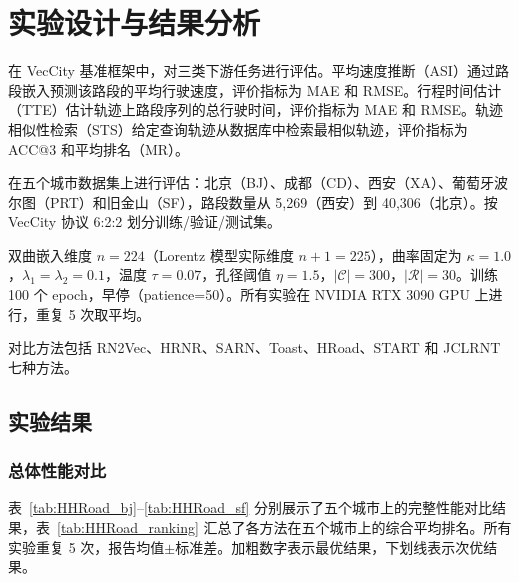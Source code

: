 \section{实验设计与结果分析}

在 VecCity\cite{zhang2025veccity} 基准框架中，对三类下游任务进行评估。平均速度推断（ASI）通过路段嵌入预测该路段的平均行驶速度，评价指标为 MAE 和 RMSE。行程时间估计（TTE）估计轨迹上路段序列的总行驶时间，评价指标为 MAE 和 RMSE。轨迹相似性检索（STS）给定查询轨迹从数据库中检索最相似轨迹，评价指标为 ACC@3 和平均排名（MR）。

在五个城市数据集上进行评估：北京（BJ）、成都（CD）、西安（XA）、葡萄牙波尔图（PRT）和旧金山（SF），路段数量从 5,269（西安）到 40,306（北京）。按 VecCity 协议 6:2:2 划分训练/验证/测试集。

双曲嵌入维度 $n=224$（Lorentz 模型实际维度 $n+1=225$），曲率固定为 $\kappa=1.0$，$\lambda_1=\lambda_2=0.1$，温度 $\tau=0.07$，孔径阈值 $\eta=1.5$，$|\mathcal{C}|=300$，$|\mathcal{R}|=30$。训练 100 个 epoch，早停（patience=50）。所有实验在 NVIDIA RTX 3090 GPU 上进行，重复 5 次取平均。

对比方法包括 RN2Vec\cite{wang2019rn2vec}、HRNR\cite{wu2020hrnr}、SARN\cite{li2023sarn}、Toast\cite{chen2021toast}、HRoad\cite{lin2023hroad}、START\cite{chen2022start} 和 JCLRNT\cite{mao2022jclrnt} 七种方法。

\subsection{实验结果}

\subsubsection{总体性能对比}

表~\ref{tab:HHRoad_bj}--\ref{tab:HHRoad_sf} 分别展示了五个城市上的完整性能对比结果，表~\ref{tab:HHRoad_ranking} 汇总了各方法在五个城市上的综合平均排名。所有实验重复 5 次，报告均值$\pm$标准差。加粗数字表示最优结果，下划线表示次优结果。

